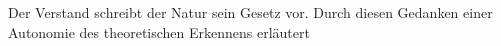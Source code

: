 \begin{nummerierung}
\begin{comment}
Die Kritikpunkte setzen jedoch ein Autonomieverständnis voraus, das nicht
dasjenige \name[Immanuel]{Kant}s ist, insofern Autonomie und Vernunft als
getrennt betrachtet
werden.\footnote{\cite[Vgl.][75--77]{ONeill:ConstructionsofReason1989}.} Eine
eindeutige Folge ist, dass wir uns von einem legislatorischen
Autonomieverständnis distanzieren
müssen.\footnote{\authorfullcite{Menke:AutonomieundBefreiung2010} sieht den
Bruch mit diesem Autonomieverständnis in \name[Immanuel]{Kant}s Redeweise von
der \singlequote{\emph{eigenen} Gesetzgebung} (statt der
\singlequote{\emph{Selbst}gesetzgebung}) darüber hinaus auch sprachlich
vollzogen \parencite[vgl.][677]{Menke:AutonomieundBefreiung2010}.} Wenn
Autonomie heißt, dass wir nur an solche Gesetze gebunden sind, die wir uns
selbst \emph{gegeben} haben, dann treffen die genannten Einwände zu. Stattdessen
müssen wir Autonomie in der Richtung interpretieren, die
\authorfullcite{Korsgaard:TheSourcesofNormativity1996} vorgegeben hat: Es geht
nicht um Gesetze, die wir uns nach Belieben \emph{geben}, sondern um
die Gesetze, in denen wir unsere Identität
ausdrücken\footnote{\enquote{[T]he principle or law by which you determine your
actions is one that you regard as being expressive of \ori{yourself}. To
identify with such a principle or way of choosing is to be, in St Paul's famous
phrase, a law to yourself}
\parencite[][100]{Korsgaard:TheSourcesofNormativity1996}.} -- oder, um mit
\authorfullcite{Menke:AutonomieundBefreiung2010} zu sprechen: um ein Gesetz,
welches ein Subjekt \emph{ist}.\footnote{\enquote{Das Gesetz, in dessen Gehorsam
ich frei bin, ist nicht das Gesetz, das ich mir selbst gegeben habe, sondern das
ich mir selbst \ori{bin}} \parencite[][678]{Menke:AutonomieundBefreiung2010}.}
Der Autonomiebegriff \name[Immanuel]{Kant}s ist nicht \emph{legislatorisch}.\footnote{Siehe
\cite[][677--679]{Menke:AutonomieundBefreiung2010}, sowie die dort zitierte
Literatur.} Ob er \emph{expressivistisch} ist, mag hier dahingestellt sein. Aus
\name[Immanuel]{Kant}s Auskünften lässt sich eines leicht entnehmen: Unsere
Vernunft ist nicht autonom, weil wir die obersten Prinzipien selbst geben,
sondern weil wir sie \emph{a priori} erkennen. Die Prinzipien sind metaphysische
Erkenntnisse, die objektiv rational sind, von denen wir subjektiv aber
rationale oder historische Erkenntnis haben können.
\end{comment}
%
%
%
\item\label{AutonomiedesVerstandes} Der Verstand schreibt der Natur sein Gesetz
vor. Durch diesen Gedanken einer Autonomie des theoretischen Erkennens erläutert

\end{nummerierung}
